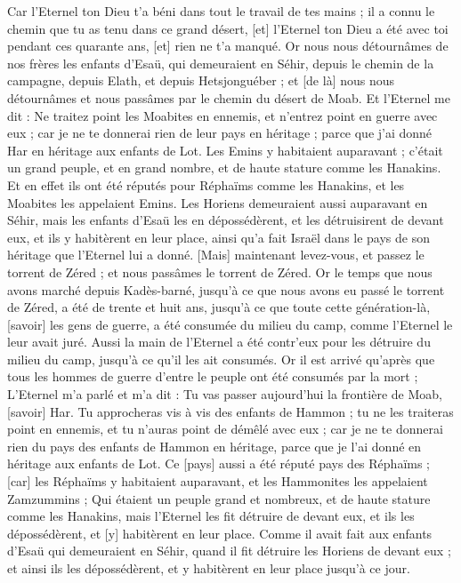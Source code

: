 \begin{multicols}{2}
Car l'Eternel ton Dieu t'a béni dans tout le travail de tes mains ; il a connu le chemin que tu as tenu dans ce grand désert, [et] l'Eternel ton Dieu a été avec toi pendant ces quarante ans, [et] rien ne t'a manqué.
Or nous nous détournâmes de nos frères les enfants d'Esaü, qui demeuraient en Séhir, depuis le chemin de la campagne, depuis Elath, et depuis Hetsjonguéber ; et [de là] nous nous détournâmes et nous passâmes par le chemin du désert de Moab.
Et l'Eternel me dit : Ne traitez point les Moabites en ennemis, et n'entrez point en guerre avec eux ; car je ne te donnerai rien de leur pays en héritage ; parce que j'ai donné Har en héritage aux enfants de Lot.
Les Emins y habitaient auparavant ; c'était un grand peuple, et en grand nombre, et de haute stature comme les Hanakins.
Et en effet ils ont été réputés pour Réphaïms comme les Hanakins, et les Moabites les appelaient Emins.
Les Horiens demeuraient aussi auparavant en Séhir, mais les enfants d'Esaü les en dépossédèrent, et les détruisirent de devant eux, et ils y habitèrent en leur place, ainsi qu'a fait Israël dans le pays de son héritage que l'Eternel lui a donné.
[Mais] maintenant levez-vous, et passez le torrent de Zéred ; et nous passâmes le torrent de Zéred.
Or le temps que nous avons marché depuis Kadès-barné, jusqu'à ce que nous avons eu passé le torrent de Zéred, a été de trente et huit ans, jusqu'à ce que toute cette génération-là, [savoir] les gens de guerre, a été consumée du milieu du camp, comme l'Eternel le leur avait juré.
Aussi la main de l'Eternel a été contr'eux pour les détruire du milieu du camp, jusqu'à ce qu'il les ait consumés.
Or il est arrivé qu'après que tous les hommes de guerre d'entre le peuple ont été consumés par la mort ;
L'Eternel m'a parlé et m'a dit :
Tu vas passer aujourd'hui la frontière de Moab, [savoir] Har.
Tu approcheras vis à vis des enfants de Hammon ; tu ne les traiteras point en ennemis, et tu n'auras point de démêlé avec eux ; car je ne te donnerai rien du pays des enfants de Hammon en héritage, parce que je l'ai donné en héritage aux enfants de Lot.
Ce [pays] aussi a été réputé pays des Réphaïms ; [car] les Réphaïms y habitaient auparavant, et les Hammonites les appelaient Zamzummins ;
Qui étaient un peuple grand et nombreux, et de haute stature comme les Hanakins, mais l'Eternel les fit détruire de devant eux, et ils les dépossédèrent, et [y] habitèrent en leur place.
Comme il avait fait aux enfants d'Esaü qui demeuraient en Séhir, quand il fit détruire les Horiens de devant eux ; et ainsi ils les dépossédèrent, et y habitèrent en leur place jusqu'à ce jour.

\end{multicols}
